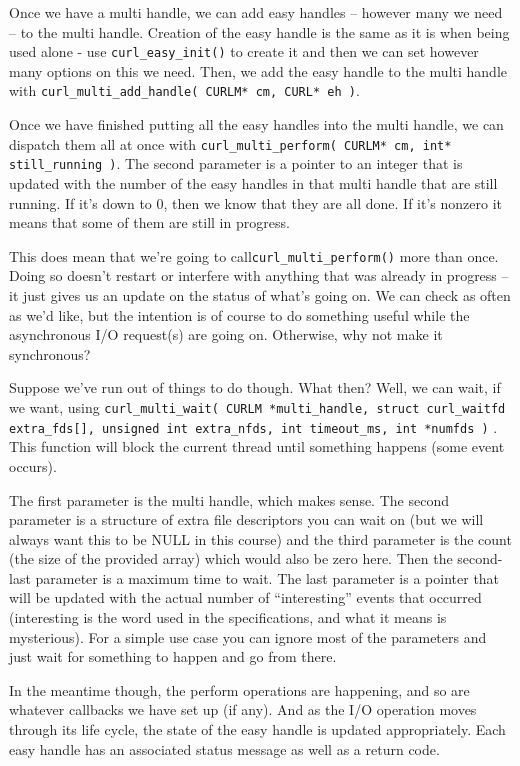 Once we have a multi handle, we can add easy handles -- however many we need -- to the multi handle. Creation of the easy handle is the same as it is when being used alone - use \texttt{curl\_easy\_init()} to create it and then we can set however many options on this we need. Then, we add the easy handle to the multi handle with \texttt{curl\_multi\_add\_handle( CURLM* cm, CURL* eh )}.

Once we have finished putting all the easy handles into the multi handle, we can dispatch them all at once with \texttt{curl\_multi\_perform( CURLM* cm, int* still\_running )}. The second parameter is a pointer to an integer that is updated with the number of the easy handles in that multi handle that are still running. If it's down to 0, then we know that they are all done. If it's nonzero it means that some of them are still in progress.

This does mean that we're going to call\texttt{curl\_multi\_perform()} more than once. Doing so doesn't restart or interfere with anything that was already in progress -- it just gives us an update on the status of what's going on. We can check as often as we'd like, but the intention is of course to do something useful while the asynchronous I/O request(s) are going on. Otherwise, why not make it synchronous?

Suppose we've run out of things to do though. What then? Well, we can wait, if we want, using \texttt{curl\_multi\_wait( CURLM *multi\_handle, struct curl\_waitfd extra\_fds[], unsigned int extra\_nfds, int timeout\_ms, int *numfds )} . This function will block the current thread until something happens (some event occurs).

The first parameter is the multi handle, which makes sense. The second parameter is a structure of extra file descriptors you can wait on (but we will always want this to be NULL in this course) and the third parameter is the count (the size of the provided array) which would also be zero here. Then the second-last parameter is a maximum time to wait. The last parameter is a pointer that will be updated with the actual number of ``interesting'' events that occurred (interesting is the word used in the specifications, and what it means is mysterious). For a simple use case you can ignore most of the parameters and just wait for something to happen and go from there.

In the meantime though, the perform operations are happening, and so are whatever callbacks we have set up (if any). And as the I/O operation moves through its life cycle, the state of the easy handle is updated appropriately. Each easy handle has an associated status message as well as a return code.

